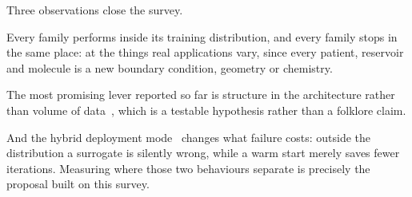 \documentclass[11pt, a4paper]{article}
\begin{document}
Three observations close the survey.

Every family performs inside its training distribution, and every family
stops in the same place: at the things real applications vary, since every
patient, reservoir and molecule is a new boundary condition, geometry or
chemistry.

The most promising lever reported so far is structure in the architecture
rather than volume of data~\citep{structpreserving, hnn}, which is a
testable hypothesis rather than a folklore claim.

And the hybrid deployment mode~\citep{nows, gnnprecond} changes what
failure costs: outside the distribution a surrogate is silently wrong,
while a warm start merely saves fewer iterations. Measuring where those
two behaviours separate is precisely the proposal built on this survey.
\end{document}
